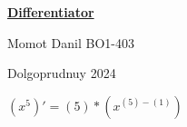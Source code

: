 \documentclass[a4paper,12pt]{article} %
\begin{document}
    \begin{titlepage}
    {\huge
    \begin{center}
    \underline{{\bf Differentiator}}
    \vspace{1cm}
    
    \end{center}
    }
    \vspace{2cm}
    \begin{center}
    
    
    {\LARGE Momot Danil
    \vspace{0.2cm}
    BO1-403}
    \end{center}
    \vspace{9.5cm}
    \begin{center}
        Dolgoprudnuy 2024
    \end{center}
    \end{titlepage}
$({{x}^{5}})' = {({5})*({{x}^{({5})-({1})}})}$
\end{document}
